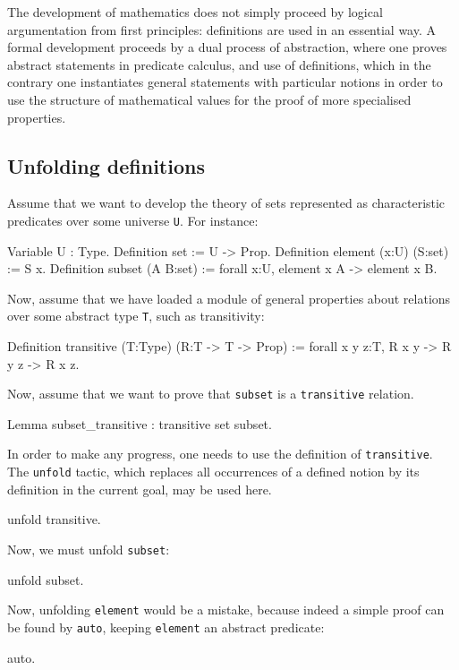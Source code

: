 \documentclass[11pt,a4paper]{book}
\begin{document}
The development of mathematics does not simply proceed by logical 
argumentation from first principles: definitions are used in an essential way.
A formal development proceeds by a dual process of abstraction, where one
proves abstract statements in predicate calculus, and use of definitions, 
which in the contrary one instantiates general statements with particular 
notions in order to use the structure of mathematical values for the proof of
more specialised properties.

\subsection{Unfolding definitions}

Assume that we want to develop the theory of sets represented as characteristic
predicates over some universe \verb:U:. For instance:
\begin{coq_example}
Variable U : Type.
Definition set := U -> Prop.
Definition element (x:U) (S:set) := S x.
Definition subset (A B:set) := 
  forall x:U, element x A -> element x B.
\end{coq_example}

Now, assume that we have loaded a module of general properties about
relations over some abstract type \verb:T:, such as transitivity:

\begin{coq_example}
Definition transitive (T:Type) (R:T -> T -> Prop) :=
  forall x y z:T, R x y -> R y z -> R x z.
\end{coq_example}

Now, assume that we want to prove that \verb:subset: is a \verb:transitive:
relation. 
\begin{coq_example}
Lemma subset_transitive : transitive set subset.
\end{coq_example}

In order to make any progress, one needs to use the definition of
\verb:transitive:. The \verb:unfold: tactic, which replaces all
occurrences of a defined notion by its definition in the current goal,
may be used here.
\begin{coq_example}
unfold transitive.
\end{coq_example}

Now, we must unfold \verb:subset::
\begin{coq_example}
unfold subset.
\end{coq_example}
Now, unfolding \verb:element: would be a mistake, because indeed a simple proof
can be found by \verb:auto:, keeping \verb:element: an abstract predicate:
\begin{coq_example}
auto.
\end{coq_example}
\end{document}

